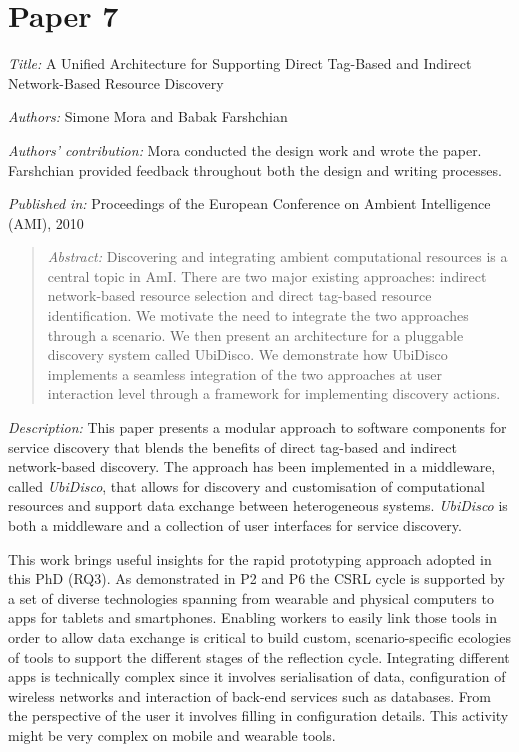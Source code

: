 
\section[P7: A Unified Architecture for Supporting Direct Tag-Based and Indirect Network-Based Resource Discovery]{Paper 7}\label{paper-7}

\emph{Title:} A Unified Architecture for Supporting Direct Tag-Based and Indirect Network-Based Resource Discovery

\emph{Authors:} Simone Mora and Babak Farshchian

\emph{Authors' contribution:} Mora conducted the design work and wrote the paper. Farshchian provided feedback throughout both the design and writing processes.

\emph{Published in:} Proceedings of the European Conference on Ambient Intelligence (AMI), 2010 
\begin{quote}
	\emph{Abstract:} Discovering and integrating ambient computational resources is a central topic in AmI. There are two major existing approaches: indirect network-based resource selection and direct tag-based resource identification. We motivate the need to integrate the two approaches through a scenario. We then present an architecture for a pluggable discovery system called UbiDisco. We demonstrate how UbiDisco implements a seamless integration of the two approaches at user interaction level through a framework for implementing discovery actions. 
\end{quote}

\emph{Description:} This paper presents a modular approach to software components for service discovery that blends the benefits of direct tag-based and indirect network-based discovery. The approach has been implemented in a middleware, called \emph{UbiDisco}, that allows for discovery and customisation of computational resources and support data exchange between heterogeneous systems. \emph{UbiDisco} is both a middleware and a collection of user interfaces for service discovery.

This work brings useful insights for the rapid prototyping approach adopted in this PhD (RQ3). As demonstrated in P2 and P6 the CSRL cycle is supported by a set of diverse technologies spanning from wearable and physical computers to apps for tablets and smartphones. Enabling workers to easily link those tools in order to allow data exchange is critical to build custom, scenario-specific ecologies of tools to support the different stages of the reflection cycle. Integrating different apps is technically complex since it involves serialisation of data, configuration of wireless networks and interaction of back-end services such as databases. From the perspective of the user it involves filling in configuration details. This activity might be very complex on mobile and wearable tools.

